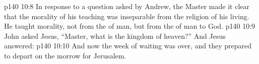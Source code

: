\vs p140 10:8 In response to a question asked by Andrew, the Master made it clear that the morality of his teaching was inseparable from the religion of his living. He taught morality, not from the  of man, but from the  of man to God.
\vs p140 10:9 \pc John asked Jesus, “Master, what is the kingdom of heaven?” And Jesus answered: 
\vs p140 10:10 \pc And now the week of waiting was over, and they prepared to depart on the morrow for Jerusalem.
